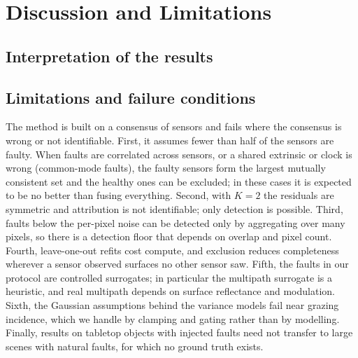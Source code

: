 \section{Discussion and Limitations}
\label{sec:discussion}

\subsection{Interpretation of the results}
\label{sec:disc:interp}

\subsection{Limitations and failure conditions}
\label{sec:disc:limits}
The method is built on a consensus of sensors and fails where the consensus
is wrong or not identifiable. First, it assumes fewer than half of the sensors are
faulty. When faults are correlated across sensors, or a shared extrinsic or
clock is wrong (common-mode faults), the faulty sensors form the largest mutually
consistent set and the healthy ones can be excluded; in these cases it is
expected to be no better than fusing everything. Second, with $K=2$ the
residuals are symmetric and attribution is not identifiable; only detection is
possible. Third, faults below the per-pixel noise can be detected only by
aggregating over many pixels, so there is a detection floor that depends on
overlap and pixel count. Fourth, leave-one-out refits cost compute, and
exclusion reduces completeness wherever a sensor observed surfaces no other
sensor saw. Fifth, the faults in our protocol are controlled surrogates; in
particular the multipath surrogate is a heuristic, and real multipath depends on
surface reflectance and modulation. Sixth, the Gaussian assumptions behind the
variance models fail near grazing incidence, which we handle by clamping and
gating rather than by modelling. Finally, results on tabletop objects with
injected faults need not transfer to large scenes with natural faults, for which
no ground truth exists. 
